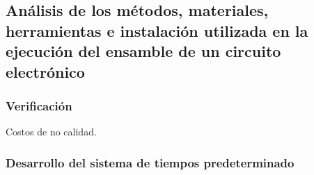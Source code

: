     \subsection{Análisis de los métodos, materiales, herramientas e instalación utilizada en la ejecución del ensamble de un circuito electrónico}
    
    \subsubsection{Verificación}
    
    Costos de no calidad.
    \subsubsection{Desarrollo del sistema de tiempos predeterminado}
